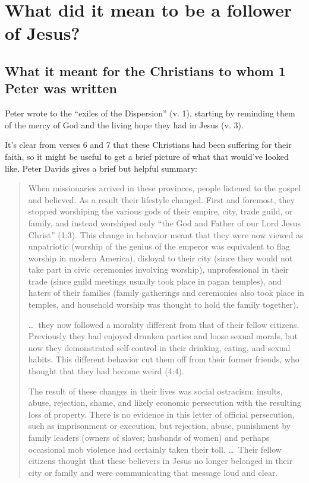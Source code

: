 \newcommand{\Date}{March 1, 2020}
\newcommand{\Title}{Teaching: 1 Peter 1}



\section{What did it mean to be a follower of Jesus?}

\subsection{What it meant for the Christians to whom 1 Peter was written}

Peter wrote to the \enquote{exiles of the Dispersion} (v. 1), starting by
reminding them of the mercy of God and the living hope they had in Jesus (v. 3).

It's clear from verses 6 and 7 that these Christians had been suffering for
their faith, so it might be useful to get a brief picture of what that would've
looked like. Peter Davids gives a brief but helpful summary:

\begin{quote}
    When missionaries arrived in these provinces, people listened to the gospel
    and believed. As a result their lifestyle changed. First and foremost, they
    stopped worshiping the various gods of their empire, city, trade guild, or
    family, and instead worshiped only “the God and Father of our Lord Jesus
    Christ” (1:3). This change in behavior meant that they were now viewed as
    unpatriotic (worship of the genius of the emperor was equivalent to flag
    worship in modern America), disloyal to their city (since they would not
    take part in civic ceremonies involving worship), unprofessional in their
    trade (since guild meetings usually took place in pagan temples), and haters
    of their families (family gatherings and ceremonies also took place in
    temples, and household worship was thought to hold the family together).

    \dots\ they now followed a morality different from that of their fellow
    citizens. Previously they had enjoyed drunken parties and loose sexual
    morals, but now they demonstrated self-control in their drinking, eating,
    and sexual habits. This different behavior cut them off from their former
    friends, who thought that they had become weird (4:4).

    The result of these changes in their lives was social ostracism: insults,
    abuse, rejection, shame, and likely economic persecution with the resulting
    loss of property. There is no evidence in this letter of official
    persecution, such as imprisonment or execution, but rejection, abuse,
    punishment by family leaders (owners of slaves; husbands of women) and
    perhaps occasional mob violence had certainly taken their toll. \dots\ Their
    fellow citizens thought that these believers in Jesus no longer belonged in
    their city or family and were communicating that message loud and clear.
    \autocite[122--123]{davids:2002}
\end{quote}


